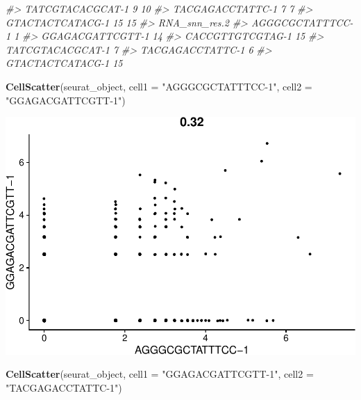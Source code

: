 \documentclass[
]{book}
\newenvironment{Shaded}{\begin{snugshade}}{\end{snugshade}}
\newcommand{\AttributeTok}[1]{\textcolor[rgb]{0.13,0.29,0.53}{#1}}
\newcommand{\CommentTok}[1]{\textcolor[rgb]{0.56,0.35,0.01}{\textit{#1}}}
\newcommand{\FunctionTok}[1]{\textcolor[rgb]{0.13,0.29,0.53}{\textbf{#1}}}
\newcommand{\NormalTok}[1]{#1}
\newcommand{\StringTok}[1]{\textcolor[rgb]{0.31,0.60,0.02}{#1}}
\begin{document}
\begin{Shaded}
\begin{Highlighting}[]
\CommentTok{\#\textgreater{} TATCGTACACGCAT{-}1               9              10}
\CommentTok{\#\textgreater{} TACGAGACCTATTC{-}1               7               7}
\CommentTok{\#\textgreater{} GTACTACTCATACG{-}1              15              15}
\CommentTok{\#\textgreater{}                  RNA\_snn\_res.2}
\CommentTok{\#\textgreater{} AGGGCGCTATTTCC{-}1             1}
\CommentTok{\#\textgreater{} GGAGACGATTCGTT{-}1            14}
\CommentTok{\#\textgreater{} CACCGTTGTCGTAG{-}1            15}
\CommentTok{\#\textgreater{} TATCGTACACGCAT{-}1             7}
\CommentTok{\#\textgreater{} TACGAGACCTATTC{-}1             6}
\CommentTok{\#\textgreater{} GTACTACTCATACG{-}1            15}

\FunctionTok{CellScatter}\NormalTok{(seurat\_object, }\AttributeTok{cell1 =} \StringTok{"AGGGCGCTATTTCC{-}1"}\NormalTok{, }\AttributeTok{cell2 =} \StringTok{"GGAGACGATTCGTT{-}1"}\NormalTok{)}
\end{Highlighting}
\end{Shaded}

\includegraphics{scRNAseqInR_ABACBS_2024_Doco_files/figure-latex/unnamed-chunk-26-1.pdf}

\begin{Shaded}
\begin{Highlighting}[]

\FunctionTok{CellScatter}\NormalTok{(seurat\_object, }\AttributeTok{cell1 =} \StringTok{"GGAGACGATTCGTT{-}1"}\NormalTok{, }\AttributeTok{cell2 =} \StringTok{"TACGAGACCTATTC{-}1"}\NormalTok{)}
\end{Highlighting}
\end{Shaded}
\end{document}
